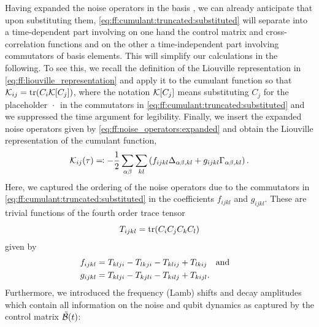 Having expanded the noise operators in the basis \basis, we can already anticipate that upon substituting them, \cref{eq:ff:cumulant:truncated:substituted} will separate into a time-dependent part involving on one hand the control matrix and cross-correlation functions and on the other a time-independent part involving commutators of basis elements.
This will simplify our calculations in the following.
To see this, we recall the definition of the Liouville representation in \cref{eq:ff:liouville_representation} and apply it to the cumulant function so that $\mathcal{K}_{ij} = \tr(C_i\mathcal{K}[C_j])$, where the notation $\mathcal{K}[C_j]$ means substituting $C_j$ for the placeholder $\:\cdot\:$ in the commutators in \cref{eq:ff:cumulant:truncated:substituted} and we suppressed the time argument for legibility.
Finally, we insert the expanded noise operators given by \cref{eq:ff:noise_operators:expanded} and obtain the Liouville representation of the cumulant function,
\begin{equation}
    \mathcal{K}_{ij}(\tau) \eqqcolon -\frac{1}{2}\sum_{\alpha\beta} \sum_{kl}\left(
        f_{ijkl}\Delta_{\alpha\beta,kl} + g_{ijkl}\Gamma_{\alpha\beta,kl}
    \right). \label{eq:ff:cumulant:truncated:liouville}
\end{equation}
Here, we captured the ordering of the noise operators due to the commutators in \cref{eq:ff:cumulant:truncated:substituted} in the coefficients $f_{ijkl}$ and $g_{ijkl}$.
These are trivial functions of the fourth order trace tensor
\begin{equation}\label{eq:ff:trace_tensor}
    T_{ijkl} = \tr(C_i C_j C_k C_l)
\end{equation}
given by
\begin{subequations}
\begin{align}\label{eq:ff:structure_constants}
    f_{ijkl} &= T_{klji} - T_{lkji} - T_{klij} + T_{lkij}\qand \\
    g_{ijkl} &= T_{klji} - T_{kjli} - T_{kilj} + T_{kijl}.
\end{align}
\end{subequations}
Furthermore, we introduced the frequency (Lamb) shifts \freqshifts and decay amplitudes \decayamps which contain all information on the noise and qubit dynamics as captured by the control matrix $\tilde{\mathcal{B}}(t)$:
